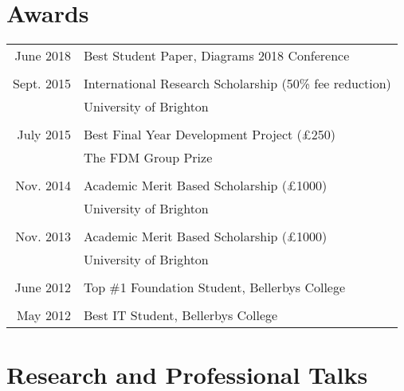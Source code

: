 \documentclass[a4paper,11pt]{article} %
\begin{document}
\section{Awards}

\begin{tabular}{rl}
June 2018 & Best Student Paper, Diagrams 2018 Conference\\
\\
Sept. 2015 & International Research Scholarship (50\% fee reduction)\\ &University of Brighton\\
\\
July 2015 & Best Final Year Development Project (£250)\\ &The FDM Group Prize \\
\\
Nov. 2014 & Academic Merit Based Scholarship (£1000)\\ &University of Brighton \\
\\
Nov. 2013 & Academic Merit Based Scholarship (£1000)\\ &University of Brighton \\
\\
June 2012 & Top \#1 Foundation Student, Bellerbys College \\
\\
May 2012 & Best IT Student, Bellerbys College \\
\end{tabular}


\section{Research and Professional Talks}
\end{document}
